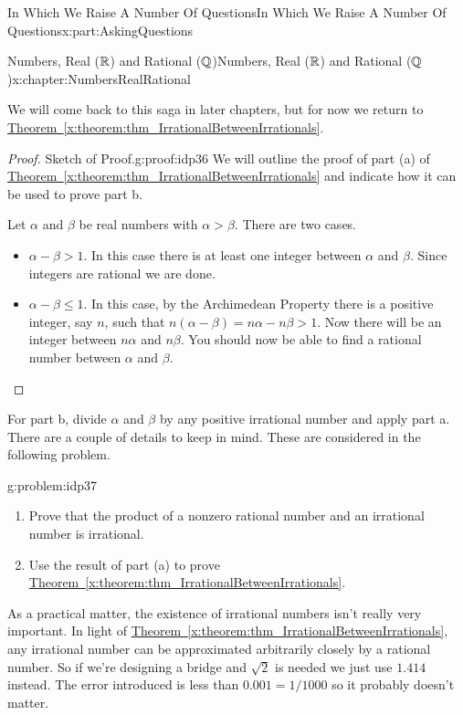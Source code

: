\begin{partptx}{In Which We Raise A Number Of Questions}{}{In Which We Raise A Number Of Questions}{}{}{x:part:AskingQuestions}
\begin{chapterptx}{Numbers, Real (\(\mathbb {R}\)) and Rational (\(\mathbb {Q}\))}{}{Numbers, Real (\(\mathbb {R}\)) and Rational (\(\mathbb {Q}\))}{}{}{x:chapter:NumbersRealRational}
\begin{introduction}{}
			\par
			We will come back to this saga in later chapters, but for now we return to \hyperref[x:theorem:thm_IrrationalBetweenIrrationals]{Theorem~{\xreffont\ref{x:theorem:thm_IrrationalBetweenIrrationals}}}.%
			\begin{proof}{Sketch of Proof.}{g:proof:idp36}
				We will outline the proof of part (a) of \hyperref[x:theorem:thm_IrrationalBetweenIrrationals]{Theorem~{\xreffont\ref{x:theorem:thm_IrrationalBetweenIrrationals}}} and indicate how it can be used to prove part b.%
				\par
				Let \(\alpha\) and \(\beta\) be real numbers with \(\alpha > \beta\). There are two cases.%
				\begin{itemize}[label=\textbullet]
					\item{}\par%
					\(\alpha-\beta > 1\). In this case there is at least one integer between \(\alpha\) and \(\beta\). Since integers are rational we are done.%
					\item{}\par%
					\(\alpha-\beta \le 1\).  In this case, by the Archimedean Property there is a positive integer, say \(n\), such that \(n(\alpha-\beta) = n\alpha-n\beta
					> 1\).  Now there will be an integer between \(n\alpha\) and \(n\beta\).  You should now be able to find a rational number between \(\alpha\) and \(\beta\).%
				\end{itemize}
			\end{proof}
			For part b, divide \(\alpha\) and \(\beta\) by any positive irrational number and apply part a. There are a couple of details to keep in mind. These are considered in the following problem.%
			\begin{problem}{}{g:problem:idp37}%
				\begin{enumerate}[font=\bfseries,label=(\alph*),ref=\alph*]
					\item{}Prove that the product of a nonzero rational number and an irrational number is irrational.%
					\item{}Use the result of part (a) to prove \hyperref[x:theorem:thm_IrrationalBetweenIrrationals]{Theorem~{\xreffont\ref{x:theorem:thm_IrrationalBetweenIrrationals}}}.%
				\end{enumerate}
			\end{problem}
			As a practical matter, the existence of irrational numbers isn't really very important. In light of \hyperref[x:theorem:thm_IrrationalBetweenIrrationals]{Theorem~{\xreffont\ref{x:theorem:thm_IrrationalBetweenIrrationals}}}, any irrational number can be approximated arbitrarily closely by a rational number. So if we're designing a bridge and \(\sqrt{2}\) is needed we just use \(1.414\) instead. The error introduced is less than \(0.001 =1/1000\) so it probably doesn't matter.%

\end{introduction}
\end{chapterptx}
\end{partptx}
